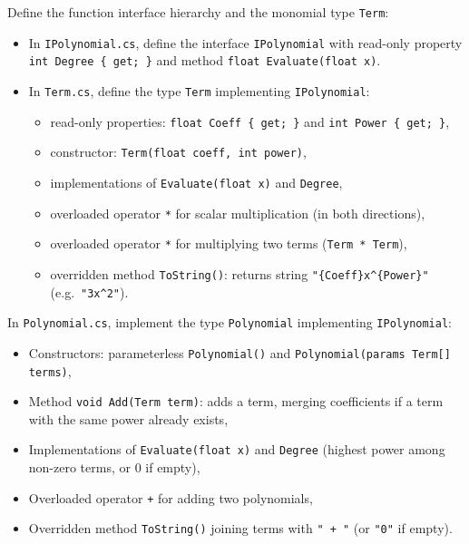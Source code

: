 \documentclass[11pt,a4paper,addpoints]{exam}
\begin{document}
\begin{questions}

\question[1]
Define the function interface hierarchy and the monomial type \texttt{Term}:
\begin{itemize}
    \item In \texttt{IPolynomial.cs}, define the interface \texttt{IPolynomial} with read-only property \texttt{int Degree \{ get; \}} and method \texttt{float Evaluate(float x)}.
    \item In \texttt{Term.cs}, define the type \texttt{Term} implementing \texttt{IPolynomial}:
    \begin{itemize}
        \item read-only properties: \texttt{float Coeff \{ get; \}} and \texttt{int Power \{ get; \}},
        \item constructor: \texttt{Term(float coeff, int power)},
        \item implementations of \texttt{Evaluate(float x)} and \texttt{Degree},
        \item overloaded operator \texttt{*} for scalar multiplication (in both directions),
        \item overloaded operator \texttt{*} for multiplying two terms (\texttt{Term * Term}),
        \item overridden method \texttt{ToString()}: returns string \texttt{"\{Coeff\}x\textasciicircum\{Power\}"} (e.g.~\texttt{"3x\textasciicircum2"}).
    \end{itemize}
\end{itemize}

\question[2]
In \texttt{Polynomial.cs}, implement the type \texttt{Polynomial} implementing \texttt{IPolynomial}:
\begin{itemize}
    \item Constructors: parameterless \texttt{Polynomial()} and \texttt{Polynomial(params Term[] terms)},
    \item Method \texttt{void Add(Term term)}: adds a term, merging coefficients if a term with the same power already exists,
    \item Implementations of \texttt{Evaluate(float x)} and \texttt{Degree} (highest power among non-zero terms, or 0 if empty),
    \item Overloaded operator \texttt{+} for adding two polynomials,
    \item Overridden method \texttt{ToString()} joining terms with \texttt{" + "} (or \texttt{"0"} if empty).
\end{itemize}


\end{questions}
\end{document}
